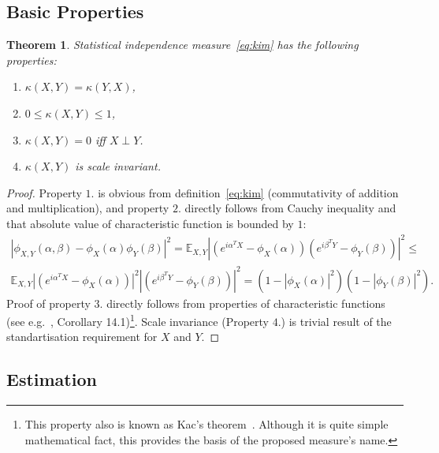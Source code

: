\documentclass{article}
\newtheorem{theorem}{Theorem}
\begin{document}

\subsection{Basic Properties}
\begin{theorem}
\label{thm:properties}
  Statistical independence measure~\eqref{eq:kim} has the following properties:
  \begin{enumerate} 
    \item $\kappa(X,Y) = \kappa(Y,X)$,
    \item $0 \leq \kappa(X,Y) \leq 1$,
    \item $\kappa(X,Y) = 0$ iff $X\perp Y$.
    \item $\kappa(X,Y)$ is scale invariant.
   \end{enumerate}    
\end{theorem}


\begin{proof}
Property $\textit{1.}$ is obvious from definition~\eqref{eq:kim} (commutativity of addition and multiplication), and property $\textit{2.}$ directly follows from Cauchy inequality and that absolute value of characteristic function is bounded by $1$:
\begin{multline*}
|\phi_{X,Y}(\alpha, \beta)  -\phi_{X}(\alpha) \phi_{Y}(\beta)|^{2} =
\mathbb{E}_{X,Y} |( e^{i\alpha^{T}X} - \phi_{X}(\alpha) )(e^{i\beta^{T}Y}- \phi_{Y}(\beta) )|^{2} \leq \\
\mathbb{E}_{X,Y} |( e^{i\alpha^{T}X} - \phi_{X}(\alpha) )|^{2} |(e^{i\beta^{T}Y}- \phi_{Y}(\beta) )|^{2}  = (1 - |\phi_{X}(\alpha)|^{2}) (1 - |\phi_{Y}(\beta)|^{2}).
\end{multline*}
Proof of property $\textit{3.}$ directly follows from properties of characteristic functions (see e.g.~\cite{Jacod}, Corollary 14.1)\footnote{This property also is known as Kac's theorem~\cite{KacTheorem}. Although it is quite simple mathematical fact, this provides the basis of the proposed measure's name.}.
Scale invariance (Property $\textit{4.}$) is trivial result of the standartisation requirement for $X$ and $Y$.
\end{proof}

\subsection{Estimation}
\end{document}
